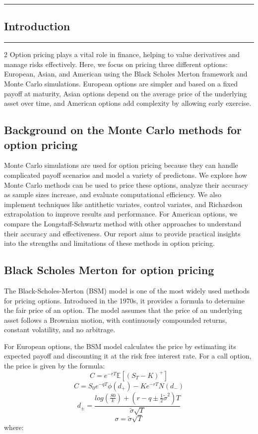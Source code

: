     {\color{gray}\hrule}
\begin{center}
\section{Introduction}
\bigskip
\end{center}
{\color{gray}\hrule}

\begin{multicols}{2}
Option pricing plays a vital role in finance, helping to value derivatives and manage risks effectively. Here, we focus on pricing three different options: European, Asian, and American using the Black Scholes Merton framework and Monte Carlo simulations. European options are simpler and based on a fixed payoff at maturity, Asian options depend on the average price of the underlying asset over time, and American options add complexity by allowing early exercise.
\subsection{Background on the Monte Carlo methods for option pricing}
Monte Carlo simulations are used for option pricing because they can handle complicated payoff scenarios and model a variety of predictons. We explore how Monte Carlo methods can be used to price these options, analyze their accuracy as sample sizes increase, and evaluate computational efficiency. We also implement techniques like antithetic variates, control variates, and Richardson extrapolation to improve results and performance. For American options, we compare the Longstaff-Schwartz\cite{VAOSSLSA} method with other approaches to understand their accuracy and effectiveness. Our report aims to provide practical insights into the strengths and limitations of these methods in option pricing.
\subsection{Black Scholes Merton for option pricing}
The Black-Scholes-Merton (BSM) model is one of the most widely used methods for pricing options. Introduced in the 1970s\cite{POCL}, it provides a formula to determine the fair price of an option. The model assumes that the price of an underlying asset follows a Brownian motion, with continuously compounded returns, constant volatility, and no arbitrage.

For European options, the BSM model\cite{TBSM} calculates the price by estimating its expected payoff and discounting it at the risk free interest rate. For a call option, the price is given by the formula\cite{522SLIDES}:
\[C = e^{-rT} \mathbb{E} [(S_T-K)^+]\]
\[
C = S_0 e^{-qT}\phi(d_+) - K e^{-rT} N(d_-)\]
\[d_{\pm} = \frac{log(\frac{S0}{k}) + (r - q \pm \frac{1}{2}\tilde{\sigma}^2)T}{\tilde{\sigma}\sqrt{T}}\]
\[\sigma = \tilde{\sigma}\sqrt{T}\]
where:


\end{multicols}
